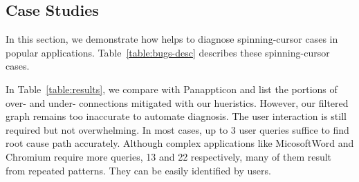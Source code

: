 \subsection{Case Studies}\label{sec:casestudy}

In this section, we demonstrate how \xxx helps to diagnose \nbug
spinning-cursor cases in popular applications. Table~\ref{table:bugs-desc}
describes these spinning-cursor cases.

In Table~\ref{table:results}, we compare \xxx with Panappticon and list the
portions of over- and under- connections mitigated with our hueristics.
However, our filtered graph remains too inaccurate to automate diagnosis.  The
user interaction is still required but not overwhelming. In most cases, up to 3
user queries suffice to find root cause path accurately. Although complex
applications like MicosoftWord and Chromium require more queries, 13 and 22
respectively, many of them result from repeated patterns. They can be easily
identified by users.




